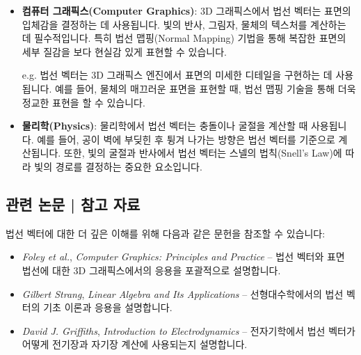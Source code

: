 \begin{itemize}
  \item \textbf{컴퓨터 그래픽스(Computer Graphics)}: 3D 그래픽스에서 법선 벡터는 표면의 입체감을 결정하는 데 사용됩니다. 빛의 반사, 그림자, 물체의 텍스처를 계산하는 데 필수적입니다. 특히 법선 맵핑(Normal Mapping) 기법을 통해 복잡한 표면의 세부 질감을 보다 현실감 있게 표현할 수 있습니다.

        \vspace{1\baselineskip}
        \noindent {} e.g. 법선 벡터는 3D 그래픽스 엔진에서 표면의 미세한 디테일을 구현하는 데 사용됩니다. 예를 들어, 물체의 매끄러운 표면을 표현할 때, 법선 맵핑 기술을 통해 더욱 정교한 표현을 할 수 있습니다.

  \item \textbf{물리학(Physics)}: 물리학에서 법선 벡터는 충돌이나 굴절을 계산할 때 사용됩니다. 예를 들어, 공이 벽에 부딪힌 후 튕겨 나가는 방향은 법선 벡터를 기준으로 계산됩니다. 또한, 빛의 굴절과 반사에서 법선 벡터는 스넬의 법칙(Snell's Law)에 따라 빛의 경로를 결정하는 중요한 요소입니다.
\end{itemize}

\subsection{관련 논문 | 참고 자료}
법선 벡터에 대한 더 깊은 이해를 위해 다음과 같은 문헌을 참조할 수 있습니다:

\begin{itemize}
  \item \textit{Foley et al.}, \textit{Computer Graphics: Principles and Practice} – 법선 벡터와 표면 법선에 대한 3D 그래픽스에서의 응용을 포괄적으로 설명합니다.
  \item \textit{Gilbert Strang}, \textit{Linear Algebra and Its Applications} – 선형대수학에서의 법선 벡터의 기초 이론과 응용을 설명합니다.
  \item \textit{David J. Griffiths}, \textit{Introduction to Electrodynamics} – 전자기학에서 법선 벡터가 어떻게 전기장과 자기장 계산에 사용되는지 설명합니다.
\end{itemize}
